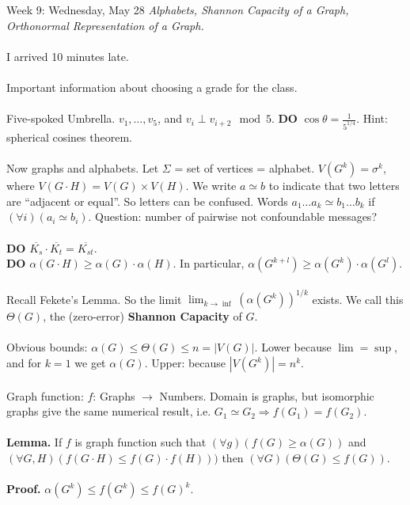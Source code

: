 \documentclass[12pt]{article}
\theoremstyle{remark}
\begin{document}
\label{25}\begin{section}
{Week 9: Wednesday, May 28}
\indent\textit{Alphabets, Shannon Capacity of a Graph, Orthonormal Representation of a Graph.}
\\\\
I arrived 10 minutes late.
\\\\
Important information about choosing a grade for the class.
\\\\
Five-spoked Umbrella. $v_1,\ldots,v_5$, and $v_i \perp v_{i+2} \mod 5$. \textbf{DO} $\cos \theta = \frac{1}{5^{1/4}}$. Hint: spherical cosines theorem.
\\\\
Now graphs and alphabets. Let $\Sigma$ = set of vertices = alphabet. $V(G^k) = \sigma^k$, where $V(G \cdot H) = V(G) \times V(H)$. We write $a \simeq b$ to indicate that two letters are ``adjacent or equal''. So letters can be confused. Words $a_1\ldots a_k \simeq b_1 \ldots b_k$ if $(\forall i)(a_i \simeq b_i)$. Question: number of pairwise not confoundable messages?
\\\\\textbf{DO} $\overline{K_s} \cdot \overline{K_t} = \overline{K_{st}}$.
\\\textbf{DO} $\alpha(G \cdot H) \geq \alpha(G) \cdot \alpha(H)$. In particular, $\alpha(G^{k +l}) \geq \alpha(G^k) \cdot \alpha(G^l)$. 
\\\\
Recall Fekete's Lemma. So the limit $\lim_{k \to \inf} (\alpha(G^k))^{1/k}$ exists. We call this $\Theta(G)$, the (zero-error) \textbf{Shannon Capacity} of $G$. 
\\\\
Obvious bounds: $\alpha(G) \leq \Theta(G) \leq n = |V(G)|$. Lower because $\lim = \sup$, and for $k = 1$ we get $\alpha(G)$. Upper: because $|V(G^k)| = n^k$.
\\\\
Graph function: $f$: Graphs $\to$ Numbers. Domain is graphs, but isomorphic graphs give the same numerical result, i.e. $G_1 \simeq G_2 \Rightarrow f(G_1) = f(G_2)$.
\\\\
\textbf{Lemma.} If $f$ is  graph function such that $(\forall g)(f(G) \geq \alpha(G))$ and $(\forall G,H)(f(G\cdot H) \leq f(G) \cdot f(H)))$ then $(\forall G)(\Theta(G) \leq f(G))$.
\\\\
\textbf{Proof.} $\alpha(G^k) \leq f(G^k) \leq f(G)^k$.

\end{section}
\end{document}

